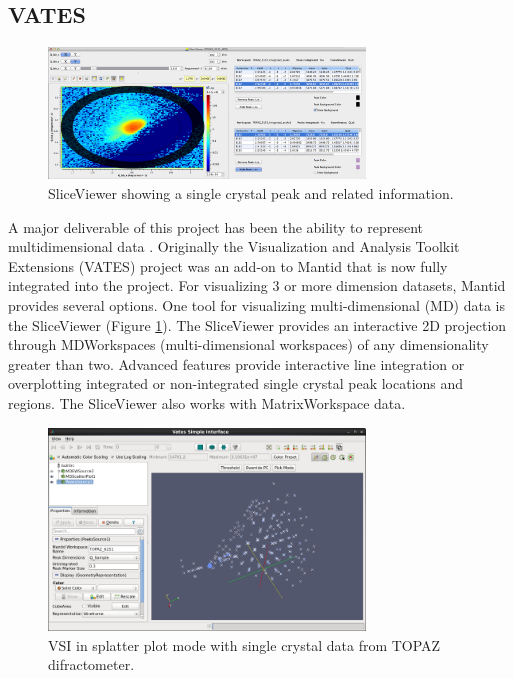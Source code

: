 \documentclass{elsarticle}
\begin{document}
\subsection{VATES}
\label{VATES}


\begin{figure}[hb]
\centerline{\includegraphics[width=0.75\textwidth]{Peaks_view.png}}
\caption{SliceViewer showing a single crystal peak and related information.}
\label{fig:SliceView}
\end{figure}

A major deliverable of this project has been the ability to represent multidimensional data \cite{Mslice, DAVE, Horace}. Originally the Visualization and Analysis Toolkit Extensions (VATES) project was an add-on to Mantid that is now fully integrated into the project. For visualizing 3 or more dimension datasets, Mantid provides several options. One tool for visualizing multi-dimensional (MD) data is the SliceViewer (Figure \ref{fig:SliceView}). The SliceViewer provides an interactive 2D projection through MDWorkspaces (multi-dimensional workspaces) of any dimensionality greater than two. Advanced features provide interactive line integration or overplotting integrated or non-integrated single crystal peak locations and regions. The SliceViewer also works with MatrixWorkspace data. 

\begin{figure}[ht]
\centerline{\includegraphics[width=0.75\textwidth]{VSI-v2-SplatterPlot.png}}
\caption{VSI in splatter plot mode with single crystal data from TOPAZ difractometer.}
\label{fig:VSI_sample}
\end{figure}
\end{document}
